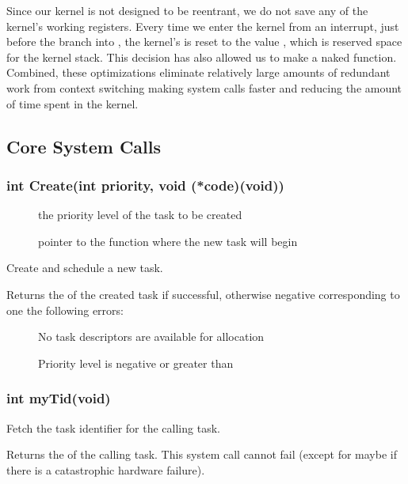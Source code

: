 \documentclass[pdftex,10pt,a4paper]{article}
\begin{document}
Since our kernel is not designed to be reentrant, we do not save
any of the kernel's working registers. Every time we enter the kernel from
an interrupt, just before the branch into , the
kernel's  is reset to the value , which is
reserved space for the kernel stack. This decision has also allowed us
to make  a naked function. Combined, these
optimizations eliminate relatively large amounts of redundant work
from context switching making system calls faster and reducing the
amount of time spent in the kernel.


\subsection*{Core System Calls}

\subsubsection*{int Create(int priority, void (*code)(void))}

\begin{description}
\item[] the priority level of the task to be created
\item[] pointer to the function where the new task will begin
\end{description}

Create and schedule a new task.

Returns the  of the created task if successful, otherwise
negative corresponding to one the following errors:

\begin{description}
\item[] No task descriptors are available for
  allocation
\item[] Priority level is negative or greater
  than 
\end{description}


\subsubsection*{int myTid(void)}

Fetch the task identifier for the calling task.

Returns the  of the calling task. This system call cannot
fail (except for maybe if there is a catastrophic hardware failure).
\end{document}
